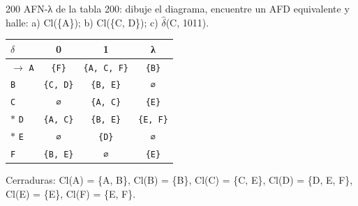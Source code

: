 \documentclass[11pt]{article}
\begin{document}
\begin{ejercicio}{200}{}
AFN-λ de la tabla 200: dibuje el diagrama, encuentre un AFD equivalente y halle: a) Cl(\{A\}); b) Cl(\{C, D\}); c) $\hat\delta$(C, 1011).
\end{ejercicio}
\proc \begin{center}\small\begin{tabular}{lccc}\toprule
$\delta$ & 0 & 1 & λ \\\midrule
$\to$ \texttt{A} & \texttt{\{F\}} & \texttt{\{A, C, F\}} & \texttt{\{B\}} \\
 \texttt{B} & \texttt{\{C, D\}} & \texttt{\{B, E\}} & \texttt{∅} \\
 \texttt{C} & \texttt{∅} & \texttt{\{A, C\}} & \texttt{\{E\}} \\
$*$ \texttt{D} & \texttt{\{A, C\}} & \texttt{\{B, E\}} & \texttt{\{E, F\}} \\
$*$ \texttt{E} & \texttt{∅} & \texttt{\{D\}} & \texttt{∅} \\
 \texttt{F} & \texttt{\{B, E\}} & \texttt{∅} & \texttt{\{E\}} \\
\bottomrule\end{tabular}\end{center}
Cerraduras: Cl(A) = \{A, B\}, Cl(B) = \{B\}, Cl(C) = \{C, E\}, Cl(D) = \{D, E, F\}, Cl(E) = \{E\}, Cl(F) = \{E, F\}.
\end{document}

